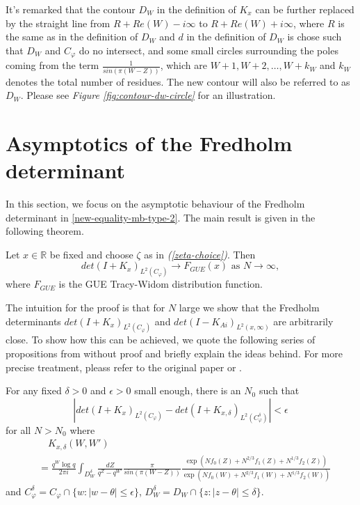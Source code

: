 \begin{remark}
\label{circle-deformation}
It's remarked that the contour $D_W$ in the definition of $K_x$ can be further replaced by the straight line from $R + Re(W) - i\infty$ to $R + Re(W) + i \infty$, where $R$ is the same as in the definition of $D_W$ and $d$ in the definition of $D_W$ is chose such that $D_W$ and $C_{\varphi}$ do no intersect, and some small circles surrounding the poles coming from the term $\frac{1}{sin(\pi (W - Z))}$, which are $W+1, W+2, \dots, W+k_W$ and $k_W$ denotes the total number of residues. The new contour will also be referred to as $D_W$. Please see \textit{Figure \ref{fig:contour-dw-circle}} for an illustration. 
\end{remark}

\section{Asymptotics of the Fredholm determinant}

In this section, we focus on the asymptotic behaviour of the Fredholm determinant in \eqref{new-equality-mb-type-2}. The main result is given in the following theorem.
\begin{theorem}
\label{asymptotic-theorem}
Let $x \in \mathbb{R}$ be fixed and choose $\zeta$ as in \textit{(\ref{zeta-choice})}. Then $$det(I+K_x)_{L^2(C_{\varphi})} \rightarrow F_{GUE}(x) \text{ as } N \rightarrow \infty,$$ where $F_{GUE}$ is the GUE Tracy-Widom distribution function. 
\end{theorem}

The intuition for the proof is that for $N$ large we show that the Fredholm determinants $det(I+K_x)_{L^2(C_{\varphi})}$ and $det(I-K_{Ai})_{L^2(x,\infty)}$ are arbitrarily close. To show how this can be achieved, we quote the following series of propositions from \cite{asymptotics2013} without proof and briefly explain the ideas behind. For more precise treatment, pleass refer to the original paper \cite{asymptotics2013} or \cite{phase2015}.

\begin{proposition} 
\label{restriction-contour}
For any fixed $\delta > 0$ and $\epsilon > 0$ small enough, there is an $N_0$ such that $$\left| det(I+K_x)_{L^2(C_{\varphi})} - det(I+K_{x,\delta})_{L^2(C_{\varphi}^{\delta})} \right| < \epsilon$$ for all $N > N_0$ where
\begin{align*}
& \quad K_{x,\delta}(W,W') \\
& = \frac{q^W \log q}{2 \pi i} \int_{D_W^{\delta}} \frac{dZ}{q^Z - q^{W'}} \frac{\pi}{sin(\pi (W-Z))} \frac{\exp(Nf_0(Z) + N^{2/3} f_1(Z) + N^{1/3} f_2(Z))}{\exp(Nf_0(W) + N^{2/3} f_1(W) + N^{1/3} f_2(W))}
\end{align*}
and $C_{\varphi}^{\delta} = C_{\varphi} \cap \{w: |w - \theta| \le \epsilon \}$, $D_W^{\delta} = D_W \cap \{z: |z - \theta| \le \delta\}$.
\end{proposition}

